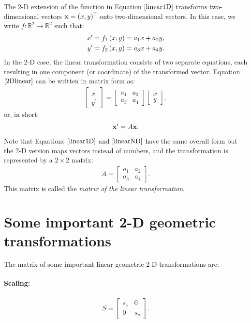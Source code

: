 \documentclass[12pt,letter]{article}
\begin{document}
The 2-D extension of the function in Equation \(\ref{linear1D}\)
transforms two-dimensional vectors \({\bf x} = (x,y)^\mathsf{T}\) onto
two-dimensional vectors. In this case, we write
\(f: \mathbb{R}^2 \rightarrow \mathbb{R}^2\) such that:
\begin{align}
		x^\prime = f_1\left(x,y\right) = a_1 x + a_2 y, \notag \\
		y^\prime = f_2\left(x,y\right) = a_3 x + a_4 y.
		\label{2Dlinear}
\end{align}
In the 2-D case, the linear transformation consists of two separate
equations, each resulting in one component (or coordinate) of the
transformed vector. Equation \(\ref{2Dlinear}\) can be written in matrix
form as:
\begin{align}
		\begin{bmatrix}
		x^\prime \\
		y^\prime
	\end{bmatrix}	
 	=
	\begin{bmatrix}
		a_1 & a_2 \\
		a_3 & a_4
	\end{bmatrix}
	\begin{bmatrix}
		x \\
		y
	\end{bmatrix},	
\end{align}
or, in short:
\begin{align}
	{\bf x}^\prime = A{\bf x}.
	\label{linearND}
\end{align}
Note that Equations \(\ref{linear1D}\) and \(\ref{linearND}\) have the
same overall form but the 2-D version maps vectors instead of numbers,
and the transformation is represented by a \(2\times2\) matrix:
\begin{align}
	A = 
	\begin{bmatrix}
		a_1 & a_2 \\
		a_3 & a_4
	\end{bmatrix}.
\end{align}
This matrix is called the {\em matrix of the linear transformation}.

\section{Some important 2-D geometric
transformations}

The matrix of some important linear geometric 2-D transformations are:

\paragraph{Scaling:}
\begin{align}
	S = 
	\begin{bmatrix}
		s_x & 0 \\
		0 & s_y
	\end{bmatrix}. 
\end{align}
\end{document}
